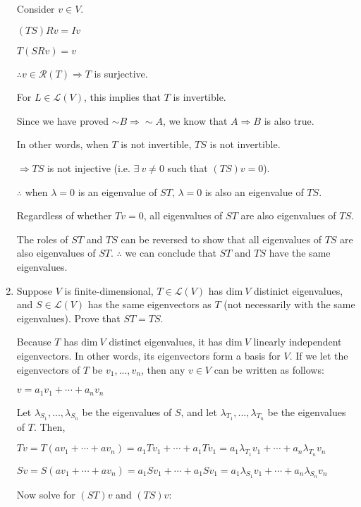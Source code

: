 \documentclass[fleqn]{article}
\begin{document}
\begin{enumerate}[nolistsep]
			Consider $v \in V$.
			
			$(TS)Rv = Iv$
			
			$T(SRv) = v$
			
			$\therefore v \in \mathcal{R}(T) \Rightarrow T$ is surjective.
			
			For $L \in \mathcal{L}(V)$, this implies that $T$ is invertible.
			
			Since we have proved ${\sim}B \Rightarrow {\sim}A$, we know that $A \Rightarrow B$ is also true.
			
			In other words, when $T$ is not invertible, $TS$ is not invertible.
			
			$\Rightarrow TS$ is not injective (i.e. $\exists\ v \neq 0$ such that $(TS)v = 0$).
			
			$\therefore$ when $\lambda = 0$ is an eigenvalue of $ST$, $\lambda = 0$ is also an eigenvalue of $TS$.
			
			Regardless of whether $Tv = 0$, all eigenvalues of $ST$ are also eigenvalues of $TS$. 
			
			The roles of $ST$ and $TS$ can be reversed to show that all eigenvalues of $TS$ are also eigenvalues of $ST$. $\therefore$ we can conclude that $ST$ and $TS$ have the same eigenvalues.
			
			\item Suppose $V$ is finite-dimensional, $T \in \mathcal{L}(V)$ has $\text{dim}\ V$ distinict eigenvalues, and $S \in \mathcal{L}(V)$ has the same eigenvectors as $T$ (not necessarily with the same eigenvalues). Prove that $ST = TS$.
			
			Because $T$ has $\text{dim}\ V$ distinct eigenvalues, it has $\text{dim}\ V$ linearly independent eigenvectors. In other words, its eigenvectors form a basis for $V$. If we let the eigenvectors of $T$ be $v_1,...,v_n$, then any $v \in V$ can be written as follows:
			
			$v = a_1v_1 + \cdots + a_nv_n$
			
			Let $\lambda_{S_1},...,\lambda_{S_n}$ be the eigenvalues of $S$, and let $\lambda_{T_1},...,\lambda_{T_n}$ be the eigenvalues of $T$. Then, 
			
			$Tv = T(av_1 + \cdots + av_n) = a_1Tv_1 + \cdots + a_1Tv_1 = a_1\lambda_{T_1}v_1 + \cdots + a_n\lambda_{T_n}v_n$
			
			$Sv = S(av_1 + \cdots + av_n) = a_1Sv_1 + \cdots + a_1Sv_1 = a_1\lambda_{S_1}v_1 + \cdots + a_n\lambda_{S_n}v_n$
			
			Now solve for $(ST)v$ and $(TS)v$:
			

\end{enumerate}
\end{document}
